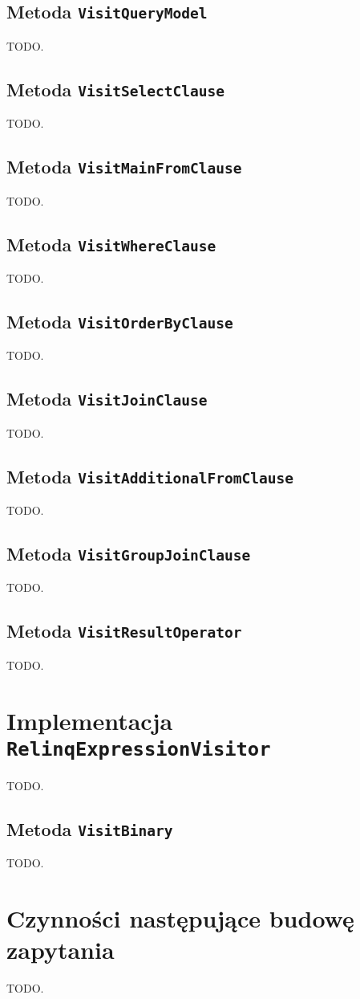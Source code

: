 \subsection{Metoda \texttt{VisitQueryModel}}
TODO.

\subsection{Metoda \texttt{VisitSelectClause}}
TODO.

\subsection{Metoda \texttt{VisitMainFromClause}}
TODO.

\subsection{Metoda \texttt{VisitWhereClause}}
TODO.

\subsection{Metoda \texttt{VisitOrderByClause}}
TODO.

\subsection{Metoda \texttt{VisitJoinClause}}
TODO.

\subsection{Metoda \texttt{VisitAdditionalFromClause}}
TODO.

\subsection{Metoda \texttt{VisitGroupJoinClause}}
TODO.

\subsection{Metoda \texttt{VisitResultOperator}}
TODO.

\section{Implementacja \texttt{RelinqExpressionVisitor}}
TODO.

\subsection{Metoda \texttt{VisitBinary}}
TODO.

\section{Czynności następujące budowę zapytania}
TODO.